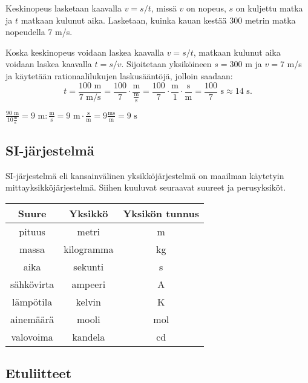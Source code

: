 \begin{esimerkki}
Keskinopeus lasketaan kaavalla $v=s/t$, missä $v$ on nopeus, $s$ on kuljettu matka ja $t$ matkaan kulunut aika.
Lasketaan, kuinka kauan kestää 300 metrin matka nopeudella 7 m/s.

Koska keskinopeus voidaan laskea kaavalla $v=s/t$, matkaan kulunut aika voidaan laskea kaavalla $t=s/v$.
Sijoitetaan yksiköineen $s=300$ m ja $v= 7$ m/s ja käytetään rationaalilukujen laskusääntöjä, jolloin saadaan:
\begin{equation*}
t=\frac{100 \textrm{ m}}{ 7 \textrm{ m/s}} = \frac{100}{7} \cdot \frac{\textrm{m}}{\frac{\textrm{m}}{\textrm{s}}} 
= \frac{100}{7} \cdot \frac{\textrm{m}}{1} \cdot \frac{\textrm{s}}{\textrm{m}} = \frac{100}{7} \textrm{ s} \approx 14 \textrm{ s}.
\end{equation*}
\end{esimerkki}

\begin{esimerkki}
$\frac{90 \textrm{ m}}{10 \frac{\textrm{m}}{\textrm{s}}} %
=9 \textrm{ m}:\frac{\textrm{m}}{\textrm{s}}=9 \textrm{ m} \cdot \frac{\textrm{s}}{\textrm{m}} = 9 \frac{\textrm{ms}}{\textrm{m}}=9 \textrm{ s}$
\end{esimerkki}

\subsection*{SI-järjestelmä}

SI-järjestelmä eli kansainvälinen yksikköjärjestelmä on maailman käytetyin mittayksikköjärjestelmä.
Siihen kuuluvat seuraavat suureet ja perusyksiköt.

\begin{tabular}{c|c|c}
Suure & Yksikkö & Yksikön tunnus\\
\hline
pituus & metri &	m\\
massa & kilogramma & kg 	\\
aika & sekunti & s \\
sähkövirta & ampeeri & A \\
lämpötila & kelvin & K \\
ainemäärä & mooli & mol \\
valovoima & kandela & cd
\end{tabular}

\subsection*{Etuliitteet}

